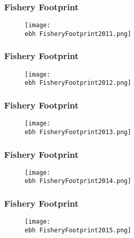 \documentclass{beamer}
\newcommand{\ebh}{\string~/bio.data/bio.lobster/figures/Assessment/LFA33/} %
\begin{document}
\begin{frame}
\frametitle{Fishery Footprint}
\begin{figure}
        \begin{center}
            \texttt{[image: \\ebh FisheryFootprint2011.png]}
        \end{center}
    \end{figure}
\end{frame}




\begin{frame}
\frametitle{Fishery Footprint}
\begin{figure}
        \begin{center}
            \texttt{[image: \\ebh FisheryFootprint2012.png]}
        \end{center}
    \end{figure}
\end{frame}




\begin{frame}
\frametitle{Fishery Footprint}
\begin{figure}
        \begin{center}
            \texttt{[image: \\ebh FisheryFootprint2013.png]}
        \end{center}
    \end{figure}
\end{frame}




\begin{frame}
\frametitle{Fishery Footprint}
\begin{figure}
        \begin{center}
            \texttt{[image: \\ebh FisheryFootprint2014.png]}
        \end{center}
    \end{figure}
\end{frame}




\begin{frame}
\frametitle{Fishery Footprint}
\begin{figure}
        \begin{center}
            \texttt{[image: \\ebh FisheryFootprint2015.png]}
        \end{center}
    \end{figure}
\end{frame}
\end{document}
